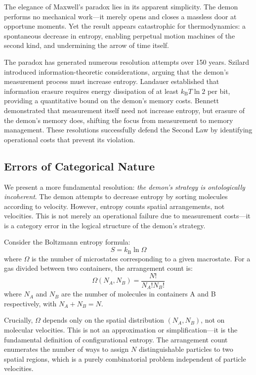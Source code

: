 \documentclass[10pt,twocolumn,letterpaper]{article}
\theoremstyle{definition}
\theoremstyle{remark}
\newcommand{\kb}{k_\text{B}}
\newcommand{\Om}{\Omega}
\begin{document}
The elegance of Maxwell's paradox lies in its apparent simplicity. The demon performs no mechanical work—it merely opens and closes a massless door at opportune moments. Yet the result appears catastrophic for thermodynamics: a spontaneous decrease in entropy, enabling perpetual motion machines of the second kind, and undermining the arrow of time itself.

The paradox has generated numerous resolution attempts over 150 years. Szilard \cite{szilard1929} introduced information-theoretic considerations, arguing that the demon's measurement process must increase entropy. Landauer \cite{landauer1961} established that information erasure requires energy dissipation of at least $\kb T \ln 2$ per bit, providing a quantitative bound on the demon's memory costs. Bennett \cite{bennett1982} demonstrated that measurement itself need not increase entropy, but erasure of the demon's memory does, shifting the focus from measurement to memory management. These resolutions successfully defend the Second Law by identifying operational costs that prevent its violation.

\subsection{Errors of Categorical Nature}

We present a more fundamental resolution: \textit{the demon's strategy is ontologically incoherent}. The demon attempts to decrease entropy by sorting molecules according to velocity. However, entropy counts spatial arrangements, not velocities. This is not merely an operational failure due to measurement costs—it is a category error in the logical structure of the demon's strategy.

Consider the Boltzmann entropy formula:
\begin{equation}
S = \kb \ln \Om
\label{eq:boltzmann}
\end{equation}
where $\Om$ is the number of microstates corresponding to a given macrostate. For a gas divided between two containers, the arrangement count is:
\begin{equation}
\Om(N_A, N_B) = \frac{N!}{N_A! N_B!}
\label{eq:omega}
\end{equation}
where $N_A$ and $N_B$ are the number of molecules in containers A and B respectively, with $N_A + N_B = N$. 

Crucially, $\Om$ depends only on the spatial distribution $(N_A, N_B)$, not on molecular velocities. This is not an approximation or simplification—it is the fundamental definition of configurational entropy. The arrangement count enumerates the number of ways to assign $N$ distinguishable particles to two spatial regions, which is a purely combinatorial problem independent of particle velocities.
\end{document}
